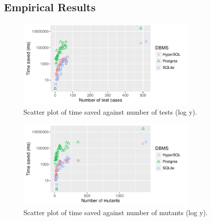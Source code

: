 	\subsection{Empirical Results}

		\begin{table}[t]
			\caption{\label{tbl:time_saved_by_dbms_table}
				Time saving summary.
			}\vspace{1em}
			\scriptsize
			\centering
		\end{table}

		\begin{figure}[t]
			\includegraphics[width=3.5in]{graphics/time_saved_vs_tests_scatter_logy.pdf}
			\caption{Scatter plot of time saved against number of tests (log y).}
		\end{figure}

		\begin{figure}[t]
			\includegraphics[width=3.5in]{graphics/time_saved_vs_mutants_scatter_logy.pdf}
			\caption{Scatter plot of time saved against number of mutants (log y).}
		\end{figure}

